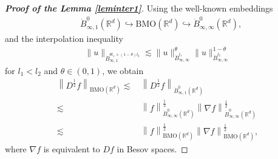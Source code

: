 \documentclass[10pt,twoside,a4paper]{article}
\numberwithin{equation}{section}\allowdisplaybreaks
\begin{document}
\begin{appendices}
	\begin{proof} [\textbf{Proof of the Lemma \ref{leminter1}}]
		
	Using the well-known embeddings
		\begin{align*}
			&\dot{B}_{\infty, 1}^0\left(\mathbb{R}^d\right) \hookrightarrow \mathrm{BMO}(\mathbb{R}^d)\hookrightarrow \dot{B}_{\infty, \infty}^0\left(\mathbb{R}^d\right), 
		\end{align*}
		and the  interpolation inequality
		\begin{align*}
			\|u\|_{\dot{B}_{\infty, 1}^{\theta l_1+(1-\theta) l_2}} \lesssim  \|u\|_{\dot{B}_{\infty, \infty}^{l_1}}^\theta\|u\|_{\dot{B}_{\infty, \infty}^{l_2}}^{1-\theta}
		\end{align*}
		for  $ l_1<l_2 $ and $ \theta \in (0,1) $, 
		we obtain
		\begin{align*}
			\left\| D^{\frac12} f \right\|_{\mathrm{BMO}(\mathbb{R}^d)}\lesssim &\, 	\left\| D^{\frac12 } f \right\|_{ \dot{B}_{\infty, 1}^0\left(\mathbb{R}^d\right)} \\
			\lesssim &\, 	\left\|  f \right\|_{ \dot{B}_{\infty, \infty}^0\left(\mathbb{R}^d\right)}^{\frac12 }	\left\| \nabla  f \right\|_{ \dot{B}_{\infty, \infty}^0\left(\mathbb{R}^d\right)}^{\frac12 }\\
			\lesssim &\, 	\left\|  f \right\|_{\mathrm{BMO}(\mathbb{R}^d)}^{\frac12 }	\left\| \nabla  f \right\|_{ \mathrm{BMO}(\mathbb{R}^d)}^{\frac12 },
		\end{align*}
where $ \nabla f $ is equivalent to $ Df $ in Besov spaces.		
	\end{proof}
		

\end{appendices}
\end{document}
